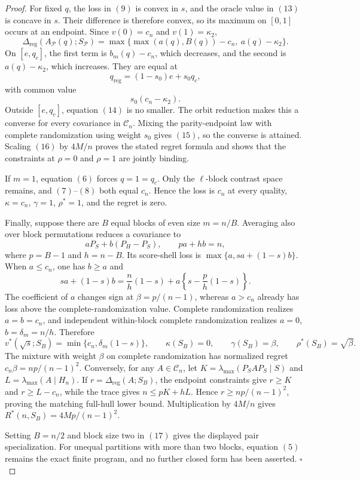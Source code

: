 \documentclass{article}
\begin{document}
\begin{proof}
For fixed \(q\), the loss in \((9)\) is convex in \(s\), and the oracle value in \((13)\) is concave in \(s\).  Their difference is therefore convex, so its maximum on \([0,1]\) occurs at an endpoint.  Since \(v(0)=c_n\) and \(v(1)=\kappa_2\),
\[
\Delta_{\mathrm{reg}}(A_{\mathcal P}(q);S_{\mathcal P})
=\max\{\max(a(q),B(q))-c_n,\ a(q)-\kappa_2\}.
\tag{14}
\]
On \([e,q_c]\), the first term is \(b_m(q)-c_n\), which decreases, and the second is \(a(q)-\kappa_2\), which increases.  They are equal at
\[
q_{\mathrm{reg}}=(1-s_0)e+s_0q_c,
\tag{15}
\]
with common value
\[
s_0(c_n-\kappa_2).
\tag{16}
\]
Outside \([e,q_c]\), equation \((14)\) is no smaller.  The orbit reduction makes this a converse for every covariance in \(\mathcal C_n\).  Mixing the parity-endpoint law with complete randomization using weight \(s_0\) gives \((15)\), so the converse is attained.  Scaling \((16)\) by \(4M/n\) proves the stated regret formula and shows that the constraints at \(\rho=0\) and \(\rho=1\) are jointly binding.

If \(m=1\), equation \((6)\) forces \(q=1=q_c\).  Only the \(\ell\)-block contrast space remains, and \((7)\)--\((8)\) both equal \(c_n\).  Hence the loss is \(c_n\) at every quality, \(\kappa=c_n\), \(\gamma=1\), \(\rho^*=1\), and the regret is zero.

Finally, suppose there are \(B\) equal blocks of even size \(m=n/B\).  Averaging also over block permutations reduces a covariance to
\[
aP_S+b(P_H-P_S),
\qquad pa+hb=n,
\]
where \(p=B-1\) and \(h=n-B\).  Its score-shell loss is \(\max\{a,sa+(1-s)b\}\).  When \(a\leq c_n\), one has \(b\geq a\) and
\[
sa+(1-s)b
=\frac{n}{h}(1-s)+a\left\{s-\frac{p}{h}(1-s)\right\}.
\]
The coefficient of \(a\) changes sign at \(\beta=p/(n-1)\), whereas \(a>c_n\) already has loss above the complete-randomization value.  Complete randomization realizes \(a=b=c_n\), and independent within-block complete randomization realizes \(a=0\), \(b=\delta_m=n/h\).  Therefore
\[
v^*(\sqrt{s};S_B)=\min\{c_n,\delta_m(1-s)\},
\qquad
\kappa(S_B)=0,
\qquad
\gamma(S_B)=\beta,
\qquad
\rho^*(S_B)=\sqrt\beta.
\tag{17}
\]
The mixture with weight \(\beta\) on complete randomization has normalized regret \(c_n\beta=np/(n-1)^2\).  Conversely, for any \(A\in\mathcal C_n\), let \(K=\lambda_{\max}(P_SAP_S\mid S)\) and \(L=\lambda_{\max}(A\mid H_n)\).  If \(r=\Delta_{\mathrm{reg}}(A;S_B)\), the endpoint constraints give \(r\geq K\) and \(r\geq L-c_n\), while the trace gives \(n\leq pK+hL\).  Hence \(r\geq np/(n-1)^2\), proving the matching full-hull lower bound.  Multiplication by \(4M/n\) gives \(R^*(n,S_B)=4Mp/(n-1)^2\).

Setting \(B=n/2\) and block size two in \((17)\) gives the displayed pair specialization.  For unequal partitions with more than two blocks, equation \((5)\) remains the exact finite program, and no further closed form has been asserted. \(\square\)
\end{proof}
\end{document}
